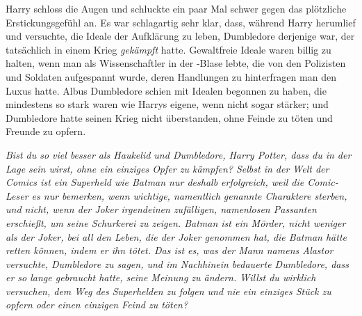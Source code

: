 Harry schloss die Augen und schluckte ein paar Mal schwer gegen das plötzliche Erstickungsgefühl an. Es war schlagartig sehr klar, dass, während Harry herumlief und versuchte, die Ideale der Aufklärung zu leben, Dumbledore derjenige war, der tatsächlich in einem Krieg \emph{gekämpft} hatte. Gewaltfreie Ideale waren billig zu halten, wenn man als Wissenschaftler in der -Blase lebte, die von den Polizisten und Soldaten aufgespannt wurde, deren Handlungen zu hinterfragen man den Luxus hatte. Albus Dumbledore schien mit Idealen begonnen zu haben, die mindestens so stark waren wie Harrys eigene, wenn nicht sogar stärker; und Dumbledore hatte seinen Krieg nicht überstanden, ohne Feinde zu töten und Freunde zu opfern.

\emph{Bist du so viel besser als Haukelid und Dumbledore, Harry Potter, dass du in der Lage sein wirst, ohne ein einziges Opfer zu kämpfen? Selbst in der Welt der Comics ist ein Superheld wie Batman nur deshalb erfolgreich, weil die Comic-Leser es nur bemerken, wenn wichtige, namentlich genannte Charaktere sterben, und nicht, wenn der Joker irgendeinen zufälligen, namenlosen Passanten erschießt, um seine Schurkerei zu zeigen. Batman ist ein Mörder, nicht weniger als der Joker, bei all den Leben, die der Joker genommen hat, die Batman hätte retten können, indem er ihn tötet. Das ist es, was der Mann namens Alastor versuchte, Dumbledore zu sagen, und im Nachhinein bedauerte Dumbledore, dass er so lange gebraucht hatte, seine Meinung zu ändern. Willst du wirklich versuchen, dem Weg des Superhelden zu folgen und nie ein einziges Stück zu opfern oder einen einzigen Feind zu töten?}

